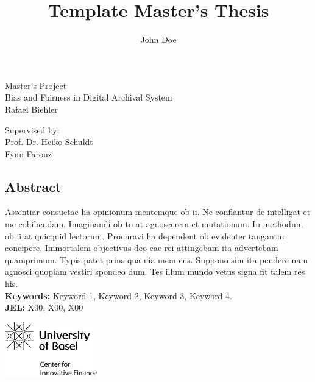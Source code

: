 \documentclass[12pt,a4paper,titlepage,oneside,english]{article}
\title{Template Master's Thesis}
\author{John Doe}
\begin{document}
\begin{center}
\vspace{1em}
\large{Master's Project}\\
\huge Bias and Fairness in Digital Archival System \\
\Large \vspace{1em}
Rafael Biehler
\end{center}

\vspace{1em}
\normalsize
\begin{flushleft}
Supervised by:\\ 
Prof. Dr. Heiko Schuldt \\
Fynn Farouz \\ 
\end{flushleft}

\vspace{1em}
\onehalfspacing
\begin{center}
\section*{Abstract}
\end{center}
Assentiar consuetae ha opinionum mentemque ob ii. Ne conflantur de intelligat et me cohibendam. Imaginandi ob to at agnoscerem et mutationum. In methodum ob ii at quicquid lectorum. Procuravi ha dependent ob evidenter tangantur concipere. Immortalem objectivus deo eae rei attingebam ita advertebam quamprimum. Typis patet prius qua nia mem ens. Suppono sim ita pendere nam agnosci quopiam vestiri spondeo dum. Tes illum mundo vetus signa fit talem res his.  \\
\vfill
\textbf{Keywords:} Keyword 1, Keyword 2, Keyword 3, Keyword 4.\\
\noindent\textbf{JEL:} X00, X00, X00




\newpage
{}
\tableofcontents

\vfill
\begin{center}
\includegraphics[width=4cm]{../assetlib/images/logo_cif.png}
\end{center}
\singlespacing
\vspace{-1.5cm}
\end{document}
